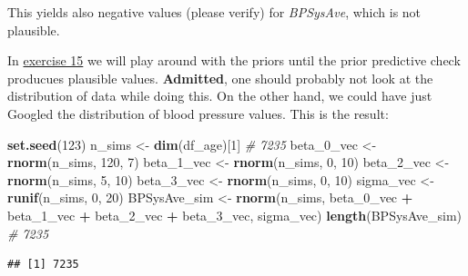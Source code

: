 \documentclass[
]{book}
\newenvironment{Shaded}{\begin{snugshade}}{\end{snugshade}}
\newcommand{\CommentTok}[1]{\textcolor[rgb]{0.56,0.35,0.01}{\textit{#1}}}
\newcommand{\DecValTok}[1]{\textcolor[rgb]{0.00,0.00,0.81}{#1}}
\newcommand{\FunctionTok}[1]{\textcolor[rgb]{0.13,0.29,0.53}{\textbf{#1}}}
\newcommand{\NormalTok}[1]{#1}
\newcommand{\OtherTok}[1]{\textcolor[rgb]{0.56,0.35,0.01}{#1}}
\newcommand{\SpecialCharTok}[1]{\textcolor[rgb]{0.81,0.36,0.00}{\textbf{#1}}}
\begin{document}
This yields also negative values (please verify) for \emph{BPSysAve}, which is not plausible.

In \hyperref[exercise15_multiple_regression]{exercise 15} we will play around with the priors
until the prior predictive check producues plausible values.
\textbf{Admitted}, one should probably not look at the distribution of data while doing this.
On the other hand, we could have just Googled the distribution of blood pressure values.
This is the result:

\begin{Shaded}
\begin{Highlighting}[]
\FunctionTok{set.seed}\NormalTok{(}\DecValTok{123}\NormalTok{)}
\NormalTok{n\_sims }\OtherTok{\textless{}{-}} \FunctionTok{dim}\NormalTok{(df\_age)[}\DecValTok{1}\NormalTok{] }\CommentTok{\# 7235}
\NormalTok{beta\_0\_vec }\OtherTok{\textless{}{-}} \FunctionTok{rnorm}\NormalTok{(n\_sims, }\DecValTok{120}\NormalTok{, }\DecValTok{7}\NormalTok{)}
\NormalTok{beta\_1\_vec }\OtherTok{\textless{}{-}} \FunctionTok{rnorm}\NormalTok{(n\_sims, }\DecValTok{0}\NormalTok{, }\DecValTok{10}\NormalTok{)}
\NormalTok{beta\_2\_vec }\OtherTok{\textless{}{-}} \FunctionTok{rnorm}\NormalTok{(n\_sims, }\DecValTok{5}\NormalTok{, }\DecValTok{10}\NormalTok{)}
\NormalTok{beta\_3\_vec }\OtherTok{\textless{}{-}} \FunctionTok{rnorm}\NormalTok{(n\_sims, }\DecValTok{0}\NormalTok{, }\DecValTok{10}\NormalTok{)}
\NormalTok{sigma\_vec }\OtherTok{\textless{}{-}} \FunctionTok{runif}\NormalTok{(n\_sims, }\DecValTok{0}\NormalTok{, }\DecValTok{20}\NormalTok{)}
\NormalTok{BPSysAve\_sim }\OtherTok{\textless{}{-}} \FunctionTok{rnorm}\NormalTok{(n\_sims, beta\_0\_vec }\SpecialCharTok{+}\NormalTok{ beta\_1\_vec }\SpecialCharTok{+}\NormalTok{ beta\_2\_vec }\SpecialCharTok{+}\NormalTok{ beta\_3\_vec, sigma\_vec)}
\FunctionTok{length}\NormalTok{(BPSysAve\_sim) }\CommentTok{\# 7235}
\end{Highlighting}
\end{Shaded}

\begin{verbatim}
## [1] 7235
\end{verbatim}
\end{document}
